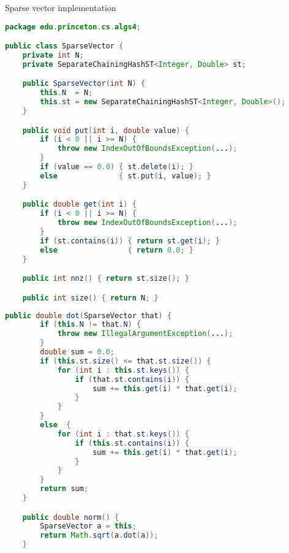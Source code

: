 \documentclass[8pt,a4paper,compress]{beamer}
\begin{document}
\begin{frame}[fragile]
Sparse vector implementation
\begin{lstlisting}[language=Java]
package edu.princeton.cs.algs4;

public class SparseVector {
    private int N; 
    private SeparateChainingHashST<Integer, Double> st; 

    public SparseVector(int N) {
        this.N  = N;
        this.st = new SeparateChainingHashST<Integer, Double>();
    }

    public void put(int i, double value) {
        if (i < 0 || i >= N) {
            throw new IndexOutOfBoundsException(...);
        }
        if (value == 0.0) { st.delete(i); }
        else              { st.put(i, value); }
    }

    public double get(int i) {
        if (i < 0 || i >= N) { 
            throw new IndexOutOfBoundsException(...);
        }
        if (st.contains(i)) { return st.get(i); }
        else                { return 0.0; }
    }

    public int nnz() { return st.size(); }

    public int size() { return N; }
\end{lstlisting}
\end{frame}

\begin{frame}[fragile]
\begin{lstlisting}[language=Java]
    public double dot(SparseVector that) {
        if (this.N != that.N) {
            throw new IllegalArgumentException(...);
        }
        double sum = 0.0;
        if (this.st.size() <= that.st.size()) {
            for (int i : this.st.keys()) {
                if (that.st.contains(i)) { 
                    sum += this.get(i) * that.get(i); 
                }
            }
        }
        else  {
            for (int i : that.st.keys()) {
                if (this.st.contains(i)) {
                    sum += this.get(i) * that.get(i);
                }
            }
        }
        return sum;
    }

    public double norm() {
        SparseVector a = this;
        return Math.sqrt(a.dot(a));
    }
\end{lstlisting}
\end{frame}
\end{document}
